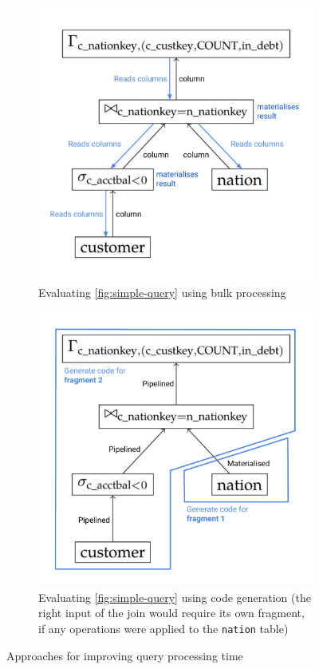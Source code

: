 \begin{figure}
\begin{subfigure}[b]{0.49\textwidth}
    \includegraphics[width=0.9\linewidth]{introduction/bulk.pdf}
    \caption{Evaluating \ref{fig:simple-query} using bulk processing}
    \label{fig:bulk-processing}
\end{subfigure}
\begin{subfigure}[b]{0.49\textwidth}
    \centering
    \includegraphics[width=0.9\linewidth]{introduction/codegen.pdf}
    \caption{Evaluating \ref{fig:simple-query} using code generation (the right input of the join would require its own fragment, if any operations were applied to the \texttt{nation} table)}
    \label{fig:code-generation}
\end{subfigure}
\caption{Approaches for improving query processing time}
\label{fig:improving-qpt}
\end{figure}


